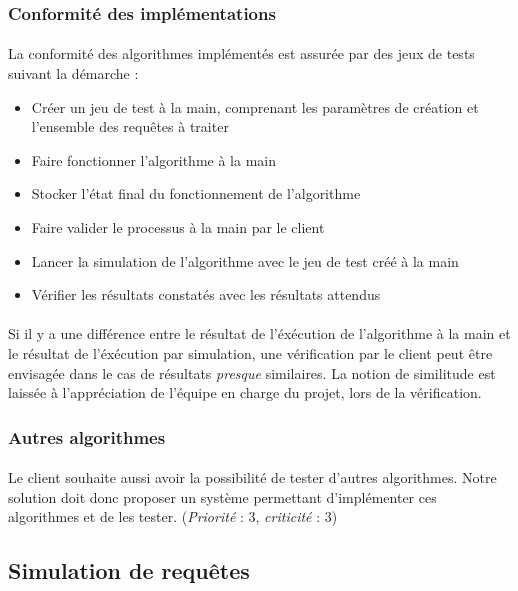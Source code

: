 \documentclass[12pt]{article}
\newcommand{\besoin}[2] {
  (\textit{Priorité} : #1, \textit{criticité} : #2)
}
\begin{document}
\subsubsection{Conformité des implémentations}

\paragraph{} La conformité des algorithmes implémentés est assurée par des jeux de tests suivant la démarche :

\begin{itemize}
	\item Créer un jeu de test à la main, comprenant les paramètres de création et l'ensemble des requêtes à traiter
	\item Faire fonctionner l'algorithme à la main
	\item Stocker l'état final du fonctionnement de l'algorithme
	\item Faire valider le processus à la main par le client
	\item Lancer la simulation de l'algorithme avec le jeu de test créé à la main
	\item Vérifier les résultats constatés avec les résultats attendus
\end{itemize}
	
\paragraph{} Si il y a une différence entre le résultat de l'éxécution de l'algorithme à la main et le résultat de l'éxécution par simulation, une vérification par le client peut être envisagée dans le cas de résultats \textit{presque} similaires. 
La notion de similitude est laissée à l'appréciation de l'équipe en charge du projet, lors de la vérification.


\subsubsection{Autres algorithmes}

\paragraph{} Le client souhaite aussi avoir la possibilité de tester d'autres algorithmes. 
Notre solution doit donc proposer un système permettant d'implémenter ces algorithmes et de les tester. \besoin{3}{3} 


\subsection{Simulation de requêtes}
\end{document}
